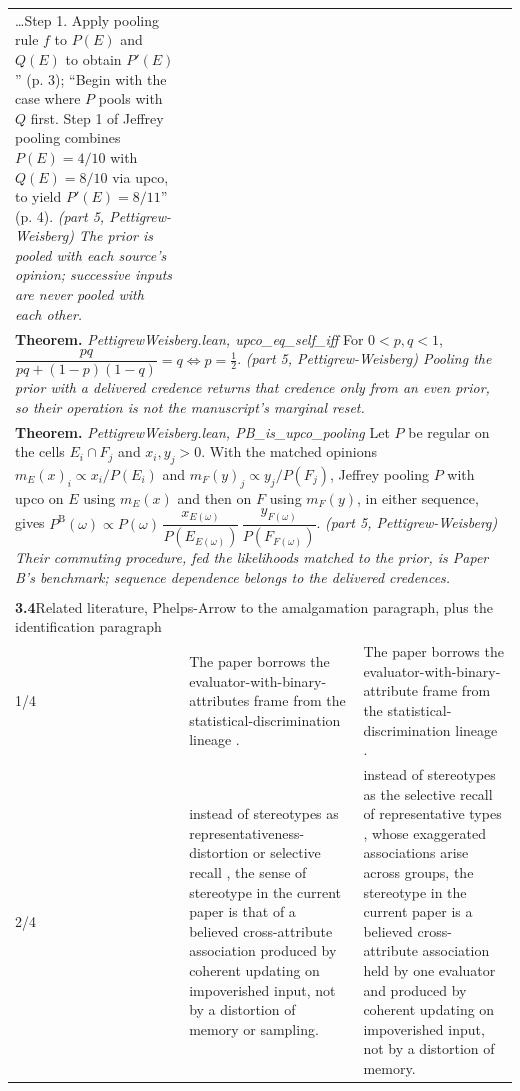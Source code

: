 \documentclass[10pt]{article}
\theoremstyle{definition}
\newcommand{\PB}{P^{\mathrm{B}}}
\newlength{\fullw}\setlength{\fullw}{25.9cm}
\newcommand{\entryhead}[2]{\multicolumn{3}{|l|}{\rule{0pt}{2.6ex}\large\textbf{#1}\quad #2} \\ \hline}
\begin{document}
{\begin{longtable}{|p{0.9cm}|p{12.2cm}|p{12.2cm}|}
{\ldots Step 1. Apply pooling rule $f$ to $P(E)$ and $Q(E)$ to obtain
$P'(E)$'' (p. 3); ``Begin with the case where $P$ pools with $Q$ first. Step 1
of Jeffrey pooling combines $P(E) = 4/10$ with $Q(E) = 8/10$ via upco, to
yield $P'(E) = 8/11$'' (p. 4). \newline \textit{(part 5, Pettigrew-Weisberg) The prior is pooled with each
source's opinion; successive inputs are never pooled with each other.}} \\
\multicolumn{3}{|p{\fullw}|}{\textbf{Theorem.} \textit{PettigrewWeisberg.lean, upco\_eq\_self\_iff} \newline For $0 < p, q < 1$,
$\dfrac{pq}{pq + (1-p)(1-q)} = q \iff p = \tfrac12$. \newline \textit{(part 5, Pettigrew-Weisberg) Pooling the prior with a delivered
credence returns that credence only from an even prior, so their operation
is not the manuscript's marginal reset.}} \\
\multicolumn{3}{|p{\fullw}|}{\textbf{Theorem.} \textit{PettigrewWeisberg.lean, PB\_is\_upco\_pooling} \newline Let $P$ be regular on the cells $E_i \cap F_j$ and $x_i, y_j > 0$.
With the matched opinions $m_E(x)_i \propto x_i / P(E_i)$ and
$m_F(y)_j \propto y_j / P(F_j)$, Jeffrey pooling $P$ with upco on $E$ using
$m_E(x)$ and then on $F$ using $m_F(y)$, in either sequence, gives
$\PB(\omega) \propto P(\omega)\, \dfrac{x_{E(\omega)}}{P(E_{E(\omega)})}\,
\dfrac{y_{F(\omega)}}{P(F_{F(\omega)})}$. \newline \textit{(part 5, Pettigrew-Weisberg) Their commuting procedure, fed the
likelihoods matched to the prior, is Paper B's benchmark; sequence dependence
belongs to the delivered credences.}} \\ \hline
\multicolumn{3}{|l|}{} \\ \hline
\entryhead{3.4}{Related literature, Phelps-Arrow to the amalgamation paragraph, plus the identification paragraph\quad{\footnotesize\textit{(formerly C.11b)}}}
1/4 & The paper borrows the evaluator-with-binary-attributes frame from the statistical-discrimination lineage \citep{Phelps1972, Arrow1973}. & The paper borrows the evaluator-with-binary-attribute frame from the statistical-discrimination lineage \citep{Arrow1973,CoateLoury1993}. \\ \hline
2/4 & instead of stereotypes as representativeness-distortion or selective recall \citep{BCGS2016}, the sense of stereotype in the current paper is that of a believed cross-attribute association produced by coherent updating on impoverished input, not by a distortion of memory or sampling. & instead of stereotypes as the selective recall of representative types \citep{BCGS2016}, whose exaggerated associations arise across groups, the stereotype in the current paper is a believed cross-attribute association held by one evaluator and produced by coherent updating on impoverished input, not by a distortion of memory. \\ \hline

\end{longtable}}
\end{document}
